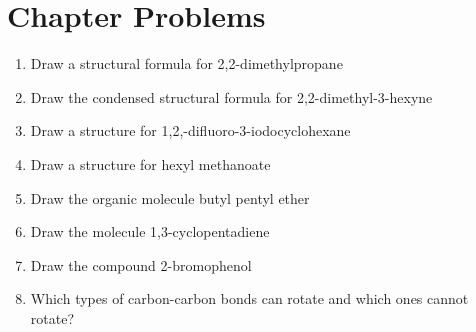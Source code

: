 \documentclass[../hchem.tex]{subfiles}
\begin{document}
\section*{Chapter Problems}
\begin{enumerate}
    \item Draw a structural formula for 2,2-dimethylpropane
    \item Draw the condensed structural formula for 2,2-dimethyl-3-hexyne 
    \item Draw a structure for 1,2,-difluoro-3-iodocyclohexane
    \item Draw a structure for hexyl methanoate 
    \item Draw the organic molecule butyl pentyl ether 
    \item Draw the molecule 1,3-cyclopentadiene
    \item Draw the compound 2-bromophenol
    \item Which types of carbon-carbon bonds can rotate and which ones cannot rotate?
\end{enumerate}
\end{document}
